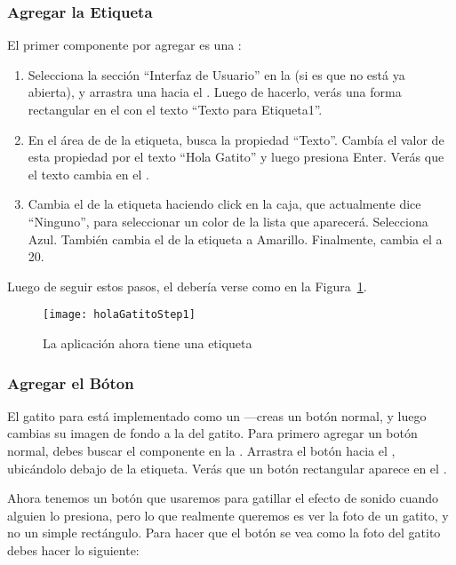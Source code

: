 \subsubsection*{Agregar la Etiqueta}

El primer componente por agregar es una :

\begin{enumerate}

\item Selecciona la sección ``Interfaz de Usuario'' en la \palette (si es que no está ya abierta), y arrastra una  hacia el \viewer. Luego de hacerlo, verás una forma rectangular en el \viewer con el texto ``Texto para Etiqueta1''.

\item En el área de \properties de la etiqueta, busca la propiedad ``Texto''. Cambía el valor de esta propiedad por el texto ``Hola Gatito'' y luego presiona Enter. Verás que el texto cambia en el \viewer.

\item Cambia el \backgroundColor de la etiqueta haciendo click en la caja, que actualmente dice ``Ninguno'', para seleccionar un color de la lista que aparecerá. Selecciona Azul. También cambia el \textColor de la etiqueta a Amarillo. Finalmente, cambia el \fontSize a 20.

\end{enumerate}

Luego de seguir estos pasos, el \designer debería verse como en la Figura~\ref{fig:holaGatitoStep1}.

\begin{figure}[H]
  \centering
  \texttt{[image: holaGatitoStep1]}
  \caption{La aplicación ahora tiene una etiqueta}
  \label{fig:holaGatitoStep1}
\end{figure}

\subsubsection*{Agregar el Bóton}
El gatito para  está implementado como un ---creas un botón normal, y luego cambias su imagen de fondo a la del gatito. Para primero agregar un botón normal, debes buscar el componente  en la \palette. Arrastra el botón hacia el \viewer, ubicándolo debajo de la etiqueta. Verás que un botón rectangular aparece en el \viewer.

Ahora tenemos un botón que usaremos para gatillar el efecto de sonido cuando alguien lo presiona, pero lo que realmente queremos es ver la foto de un gatito, y no un simple rectángulo. Para hacer que el botón se vea como la foto del gatito debes hacer lo siguiente:

